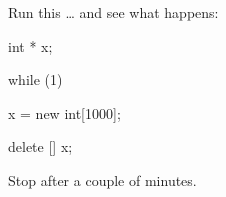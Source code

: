 Run this \ldots{} and see what happens:



\begin{consolethree}[escapeinside=||]

int * x;

while (1)

{

    x = new int[1000];

    delete [] x;

}

\end{consolethree}



Stop after a couple of minutes.

